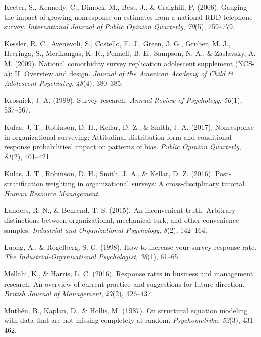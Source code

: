 \documentclass[
  man,mask]{apa7}
\newlength{\cslhangindent}
\newenvironment{CSLReferences}[2] %
 {\begin{list}{}{%
  \setlength{\itemindent}{0pt}
  \setlength{\leftmargin}{0pt}
  \setlength{\parsep}{0pt}
  \ifodd #1
   \setlength{\leftmargin}{\cslhangindent}
   \setlength{\itemindent}{-1\cslhangindent}
  \fi
  \setlength{\itemsep}{#2\baselineskip}}}
 {\end{list}}
\begin{document}
\begin{CSLReferences}{1}{0}
Keeter, S., Kennedy, C., Dimock, M., Best, J., \& Craighill, P. (2006). Gauging the impact of growing nonresponse on estimates from a national {RDD} telephone survey. \emph{International Journal of Public Opinion Quarterly}, \emph{70}(5), 759--779.

Kessler, R. C., Avenevoli, S., Costello, E. J., Green, J. G., Gruber, M. J., Heeringa, S., Merikangas, K. R., Pennell, B.-E., Sampson, N. A., \& Zaslavsky, A. M. (2009). National comorbidity survey replication adolescent supplement ({NCS}-a): {II}. Overview and design. \emph{Journal of the American Academy of Child \& Adolescent Psychiatry}, \emph{48}(4), 380--385.

Krosnick, J. A. (1999). Survey research. \emph{Annual Review of Psychology}, \emph{50}(1), 537--567.

Kulas, J. T., Robinson, D. H., Kellar, D. Z., \& Smith, J. A. (2017). Nonresponse in organizational surveying: Attitudinal distribution form and conditional response probabilities' impact on patterns of bias. \emph{Public Opinion Quarterly}, \emph{81}(2), 401--421.

Kulas, J. T., Robinson, D. H., Smith, J. A., \& Kellar, D. Z. (2016). Post-stratification weighting in organizational surveys: A cross-disciplinary tutorial. \emph{Human Resource Management}.

Landers, R. N., \& Behrend, T. S. (2015). An inconvenient truth: Arbitrary distinctions between organizational, mechanical turk, and other convenience samples. \emph{Industrial and Organizational Psychology}, \emph{8}(2), 142--164.

Luong, A., \& Rogelberg, S. G. (1998). How to increase your survey response rate. \emph{The Industrial-Organizational Psychologist}, \emph{36}(1), 61--65.

Mellahi, K., \& Harris, L. C. (2016). Response rates in business and management research: An overview of current practice and suggestions for future direction. \emph{British Journal of Management}, \emph{27}(2), 426--437.

Muthén, B., Kaplan, D., \& Hollis, M. (1987). On structural equation modeling with data that are not missing completely at random. \emph{Psychometrika}, \emph{52}(3), 431--462.


\end{CSLReferences}
\end{document}
